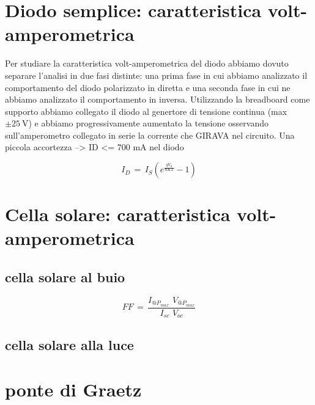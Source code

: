 \section{Diodo semplice: caratteristica volt-amperometrica}

Per studiare la caratteristica volt-amperometrica del diodo abbiamo dovuto separare l'analisi in due fasi distinte: una prima fase in cui abbiamo analizzato il comportamento del diodo polarizzato in diretta e una seconda fase in cui ne abbiamo analizzato il comportamento in inversa.
Utilizzando la breadboard come supporto abbiamo collegato il diodo al genertore di tensione continua (max $\pm \SI{25}{\volt}$) %
e abbiamo progressivamente aumentato la tensione osservando sull'amperometro collegato in serie la corrente che GIRAVA nel circuito.
Una piccola accortezza --> ID <= 700 mA nel diodo

\begin{equation}
I_{D} \, = \, I_{S} \left( e^{\frac{q V_d}{nKT}} -1 \right)
\label{eq:diode}
\end{equation}

\section{Cella solare: caratteristica volt-amperometrica}
\subsection{cella solare al buio}

\begin{equation}
FF \, = \, \frac{I_{@P_{max}} \,\, V_{@P_{max}}}{I_{sc} \,\, V_{oc}}
\label{eq:FF}
\end{equation}

\subsection{cella solare alla luce}


\section{ponte di Graetz}